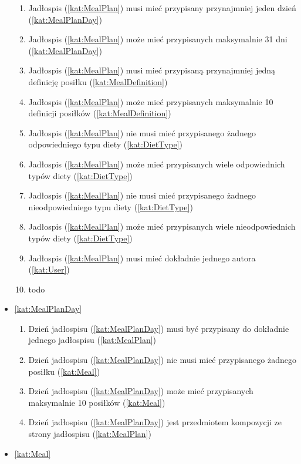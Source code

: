 \begin{itemize}[label={\textbf{Reguły dla}}, wide, labelwidth=!, labelindent=0pt]
\begin{enumerate}[label={\textbf{REG/\protect\threedigits{\arabic{enumi}}}}, wide, labelwidth=!, align=left, leftmargin=3cm, resume]
        \item Jadłospis (\ref{kat:MealPlan}) musi mieć przypisany przynajmniej jeden dzień (\ref{kat:MealPlanDay})
        \item Jadłospis (\ref{kat:MealPlan}) może mieć przypisanych maksymalnie 31 dni (\ref{kat:MealPlanDay})
        \item Jadłospis (\ref{kat:MealPlan}) musi mieć przypisaną przynajmniej jedną definicję posiłku (\ref{kat:MealDefinition})
        \item Jadłospis (\ref{kat:MealPlan}) może mieć przypisanych maksymalnie 10 definicji posiłków (\ref{kat:MealDefinition})
        \item Jadłospis (\ref{kat:MealPlan}) nie musi mieć przypisanego żadnego odpowiedniego typu diety (\ref{kat:DietType})
        \item Jadłospis (\ref{kat:MealPlan}) może mieć przypisanych wiele odpowiednich typów diety (\ref{kat:DietType})
        \item Jadłospis (\ref{kat:MealPlan}) nie musi mieć przypisanego żadnego nieodpowiedniego typu diety (\ref{kat:DietType})
        \item Jadłospis (\ref{kat:MealPlan}) może mieć przypisanych wiele nieodpowiednich typów diety (\ref{kat:DietType})
        \item Jadłospis (\ref{kat:MealPlan}) musi mieć dokładnie jednego autora (\ref{kat:User})
        \item todo
    \end{enumerate}
    \item\ref{kat:MealPlanDay}
    \begin{enumerate}[label={\textbf{REG/\protect\threedigits{\arabic{enumi}}}}, wide, labelwidth=!, align=left, leftmargin=3cm, resume]
        \item Dzień jadłospisu (\ref{kat:MealPlanDay}) musi być przypisany do dokładnie jednego jadłospisu (\ref{kat:MealPlan})
        \item Dzień jadłospisu (\ref{kat:MealPlanDay}) nie musi mieć przypisanego żadnego posiłku (\ref{kat:Meal})
        \item Dzień jadłospisu (\ref{kat:MealPlanDay}) może mieć przypisanych maksymalnie 10 posiłków (\ref{kat:Meal})
        \item Dzień jadłospisu (\ref{kat:MealPlanDay}) jest przedmiotem kompozycji ze strony jadłospisu (\ref{kat:MealPlan})
    \end{enumerate}
    \item\ref{kat:Meal}

\end{itemize}
